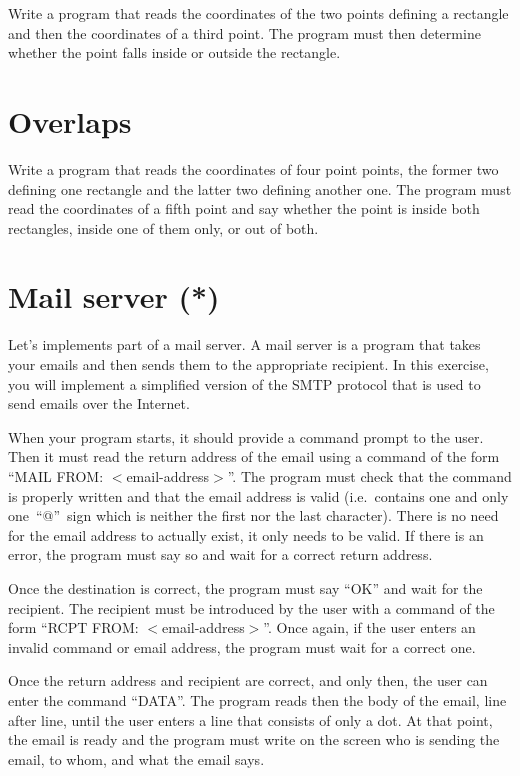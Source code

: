 \documentclass{article}
\begin{document}
Write a program that reads the coordinates of the two points defining a
rectangle and then the coordinates of a third point. The program must
then determine whether the point falls inside or outside the
rectangle. 

\section{Overlaps}
\label{sec:insideinside}

Write a program that reads the coordinates of four point points, the
former two defining one rectangle and the latter two defining
another one. The program must read the coordinates of a fifth point and
say whether the point is inside both rectangles, inside one of them
only, or out of both. 


\section{Mail server (*)}
\label{sec:mail-server}

Let's implements part of a mail server. A mail server is a program
that takes your emails and then sends them to the appropriate
recipient. In this exercise, you will implement a simplified version
of the SMTP protocol that is used to send emails over the Internet. 

When your program starts, it should provide a command prompt to the
user. Then it must read the return address of the email using a
command of the form ``MAIL FROM: $<$email-address$>$''. The program
must check that the command is properly written and that the email
address is valid (i.e.~contains one and only one~``@''~sign 
which is neither the
first nor the last character). There is no need for the email address
to actually exist, it only needs to be valid. If there is an error,
the program must 
say so and wait for a correct return address.

Once the destination is correct, the program must say ``OK'' and wait
for the recipient. The recipient must be introduced by the user with a
command of the form ``RCPT FROM: $<$email-address$>$''. Once again, if
the user enters an invalid command or email address, the program must
wait for a correct one. 

Once the return address and recipient are correct, and only then, the
user can enter the command ``DATA''. The program reads then the body
of the email, line after line, until the user enters a line that
consists of only a dot. At that point, the email is ready and the
program must write on the screen who is sending the email, to whom,
and what the email says. 
\end{document}

